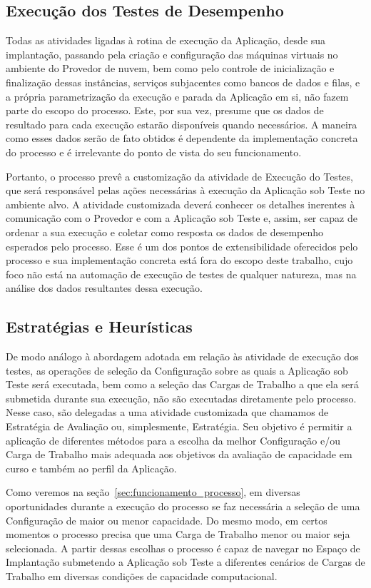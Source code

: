 \subsection{Execução dos Testes de Desempenho}
Todas as atividades ligadas à rotina de execução da Aplicação, desde sua implantação,
passando pela criação e configuração das máquinas virtuais no ambiente do Provedor 
de nuvem, bem como pelo controle de inicialização e finalização dessas instâncias, 
serviços subjacentes como bancos de dados e filas, e a própria parametrização da 
execução e parada da Aplicação em si, não fazem parte do escopo do processo. Este,
por sua vez, presume que os dados de resultado para cada execução estarão disponíveis
quando necessários. A maneira como esses dados serão de fato obtidos é dependente
da implementação concreta do processo e é irrelevante do ponto de vista do seu 
funcionamento.  

Portanto, o processo prevê a customização da atividade de Execução do Testes, que será 
responsável pelas ações necessárias à execução da Aplicação sob Teste no ambiente
alvo. A atividade customizada deverá conhecer os detalhes inerentes à comunicação com 
o Provedor e com a Aplicação sob Teste e, assim, ser capaz de ordenar a sua execução e 
coletar como resposta os dados de desempenho esperados pelo processo. Esse é um dos 
pontos de extensibilidade oferecidos pelo processo e sua implementação concreta está 
fora do escopo deste trabalho, cujo foco não está na automação de execução de testes 
de qualquer natureza, mas na análise dos dados resultantes dessa execução.

\subsection{Estratégias e Heurísticas}
\label{sec:heuristicas}
De modo análogo à abordagem adotada em relação às atividade de execução dos testes, 
as operações de seleção da Configuração sobre as quais a Aplicação
sob Teste será executada, bem como a seleção das Cargas de Trabalho a que ela 
será submetida durante sua execução, não são executadas diretamente pelo processo.
Nesse caso, são delegadas a uma atividade customizada que chamamos de Estratégia de 
Avaliação ou, simplesmente, Estratégia. Seu objetivo é permitir a aplicação de 
diferentes métodos para a escolha da melhor Configuração e/ou Carga de Trabalho 
mais adequada aos objetivos da avaliação de capacidade em curso e também ao perfil 
da Aplicação.

Como veremos na seção~\ref{sec:funcionamento_processo}, em diversas oportunidades
durante a execução do processo se faz necessária a seleção de uma Configuração de
maior ou menor capacidade. Do mesmo modo, em certos momentos o processo precisa
que uma Carga de Trabalho menor ou maior seja selecionada. A partir dessas escolhas
o processo é capaz de navegar no Espaço de Implantação submetendo a Aplicação sob
Teste a diferentes cenários de Cargas de Trabalho em diversas condições de capacidade
computacional.

